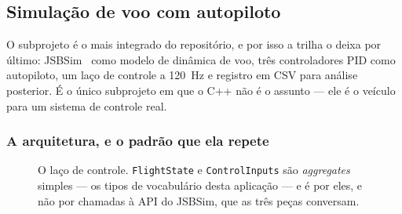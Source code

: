 \subsection{Simulação de voo com autopiloto}
\label{sec:flight-simulator}

O subprojeto  é o mais integrado do repositório, e por
isso a trilha o deixa por último: JSBSim~\cite{jsbsim} como modelo de dinâmica
de voo, três controladores PID como autopiloto, um laço de controle a 120~Hz e
registro em CSV para análise posterior. É o único subprojeto em que o C++ não é
o assunto --- ele é o veículo para um sistema de controle real.

\subsubsection{A arquitetura, e o padrão que ela repete}

\begin{figure}[htbp]
\centering
{}
\caption{O laço de controle. \texttt{FlightState} e \texttt{ControlInputs} são
         \emph{aggregates} simples --- os tipos de vocabulário desta aplicação
         --- e é por eles, e não por chamadas à API do JSBSim, que as três peças
         conversam.}
\label{fig:flight}
\end{figure}

